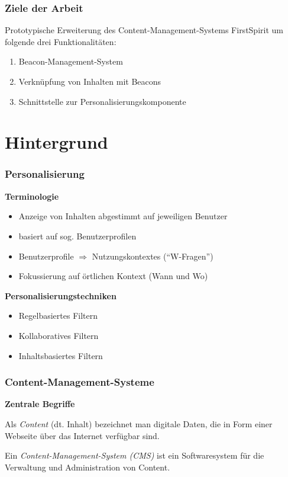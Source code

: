 \documentclass{beamer}
\begin{document}
\begin{frame}
\frametitle{Ziele der Arbeit}

Prototypische \alert{Erweiterung} des Content-Management-Systems
\alert{FirstSpirit} um folgende \alert{drei Funktionalitäten}:

\begin{enumerate}
	\item Beacon-Management-System
 	\item Verknüpfung von Inhalten mit Beacons
 	\item Schnittstelle zur Personalisierungskomponente
\end{enumerate}

\end{frame}

\section[Hintergrund]{Hintergrund}

\begin{frame}
\frametitle<presentation>{Personalisierung}

{\textbf{Terminologie}}

\begin{itemize}
  \item Anzeige von Inhalten abgestimmt auf jeweiligen Benutzer
  \item basiert auf sog. Benutzerprofilen
  \item Benutzerprofile $\Rightarrow$ Nutzungskontextes ("`W-Fragen"')
  \item Fokussierung auf örtlichen Kontext (Wann und Wo)
\end{itemize}


{\textbf{Personalisierungstechniken}}

\begin{itemize}
  \item Regelbasiertes Filtern
  \item Kollaboratives Filtern
  \item Inhaltsbasiertes Filtern
\end{itemize}

\end{frame}

\begin{frame}
\frametitle<presentation>{Content-Management-Systeme}

\textbf{Zentrale Begriffe}

\begin{definition}[Content]
Als \textit{Content} (dt. Inhalt) bezeichnet man \alert{digitale Daten}, die
  \alert{in Form einer Webseite über} das \alert{Internet verfügbar} sind.
\end{definition}

\begin{definition}
  Ein \textit{Content-Management-System (CMS)} ist ein
  \alert{Softwaresystem} für die \alert{Verwaltung und Administration von Content}.
\end{definition}

\end{frame}
\end{document}
